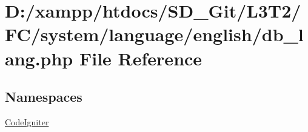 \hypertarget{db__lang_8php}{}\section{D\+:/xampp/htdocs/\+S\+D\+\_\+\+Git/\+L3\+T2/\+F\+C/system/language/english/db\+\_\+lang.php File Reference}
\label{db__lang_8php}
\subsection*{Namespaces}
\begin{DoxyCompactItemize}
\item 
 \hyperlink{namespace_code_igniter}{Code\+Igniter}
\end{DoxyCompactItemize}
